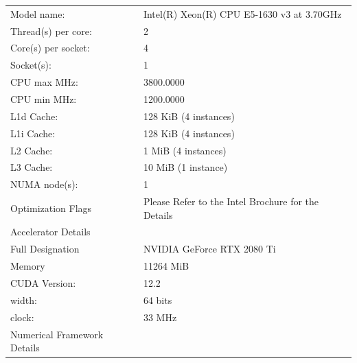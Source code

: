 {\begin{table}
\begin{tabular}{||l l||}
     Model name:                  & Intel(R) Xeon(R) CPU E5-1630 v3 at 3.70GHz  	        	\\
     Thread(s) per core:          & 2                                                       \\
     Core(s) per socket:          & 4                                                   		\\
     Socket(s):                   & 1 	                                                	  \\
     CPU max MHz:                 & 3800.0000 	                                         	  \\
     CPU min MHz:                 & 1200.0000                                         	  	\\
     L1d Cache:                   & 128 KiB (4 instances)                           	    	\\
     L1i Cache:                   & 128 KiB (4 instances) 	 	                              \\
     L2 Cache:                    & 1 MiB (4 instances) 	                                 	\\
     L3 Cache:                    & 10 MiB (1 instance) 	 	                                \\
     NUMA node(s):                & 1                                               	 	    \\
     Optimization Flags           & Please Refer to the Intel Brochure for the Details  		\\[1ex] 
     \hline
     \hline
     Accelerator Details 			    &  					                                            	\\[0.5ex] 
     \hline\hline
     Full Designation 	    			& NVIDIA GeForce RTX 2080 Ti 	                            \\ 
     Memory   	              		& 11264 MiB 	                                           	\\
     CUDA Version:                & 12.2  	                                               	\\
     width:                       & 64 bits                                                 \\
     clock:                       & 33 MHz 	                                                \\[1ex] 
     \hline
     \hline
     Numerical Framework Details	&  				                                            		\\[0.5ex] 

\end{tabular}
\end{table}}
